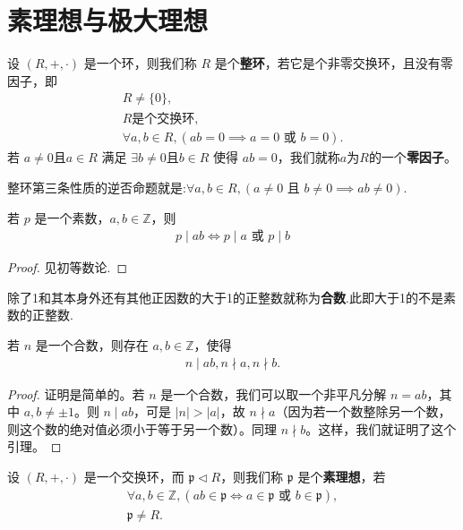 \documentclass[../../main.tex]{subfiles}
\begin{document}
\section{素理想与极大理想}

\begin{definition}[整环]
设 $(R, +, \cdot)$ 是一个环，则我们称 $R$ 是个\textbf{整环}，若它是个非零交换环，且没有零因子，即
\begin{gather*}
R \neq \{0\},
\\
R \text{是个交换环},
\\
\forall a, b \in R, (ab = 0 \implies a = 0 \text{ 或 } b = 0).
\end{gather*}
若 $a \neq 0$且$a\in R$ 满足 $\exists b \neq 0$且$b\in R$ 使得 $ab = 0$，我们就称$a$为$R$的一个\textbf{零因子}。
\end{definition}
\begin{note}
整环第三条性质的逆否命题就是:$\forall a, b \in R, (a \ne 0 \text{ 且 } b \ne 0 \implies ab \ne 0).$
\end{note}

\begin{lemma}\label{lemma:素数的基本性质}
若 $p$ 是一个素数，$a, b \in \mathbb{Z}$，则
\begin{align*}
p \mid ab \iff p \mid a \text{ 或 } p \mid b
\end{align*}
\end{lemma}
\begin{proof}
见初等数论.
\end{proof}

\begin{definition}[合数]
除了1和其本身外还有其他正因数的大于1的正整数就称为\textbf{合数}.此即大于1的不是素数的正整数.
\end{definition}

\begin{lemma}\label{lemma:合数的基本性质}
若 $n$ 是一个合数，则存在 $a, b \in \mathbb{Z}$，使得
\begin{align*}
n \mid ab ,
n \nmid a ,
n \nmid b .
\end{align*}
\end{lemma}
\begin{proof}
证明是简单的。若 $n$ 是一个合数，我们可以取一个非平凡分解 $n = ab$，其中 $a, b \neq \pm 1$。则 $n \mid ab$，可是 $|n| > |a|$，故 $n \nmid a$（因为若一个数整除另一个数，则这个数的绝对值必须小于等于另一个数）。同理 $n \nmid b$。这样，我们就证明了这个引理。 
\end{proof}

\begin{definition}[素理想]
设 $(R, +, \cdot)$ 是一个交换环，而 $\mathfrak{p} \lhd R$，则我们称 $\mathfrak{p}$ 是个\textbf{素理想}，若
\begin{gather*}
\forall a, b \in \mathbb{Z}, (ab \in \mathfrak{p} \iff a \in \mathfrak{p} \text{ 或 } b \in \mathfrak{p}),
\\
\mathfrak{p} \neq R.
\end{gather*}
\end{definition}
\end{document}
